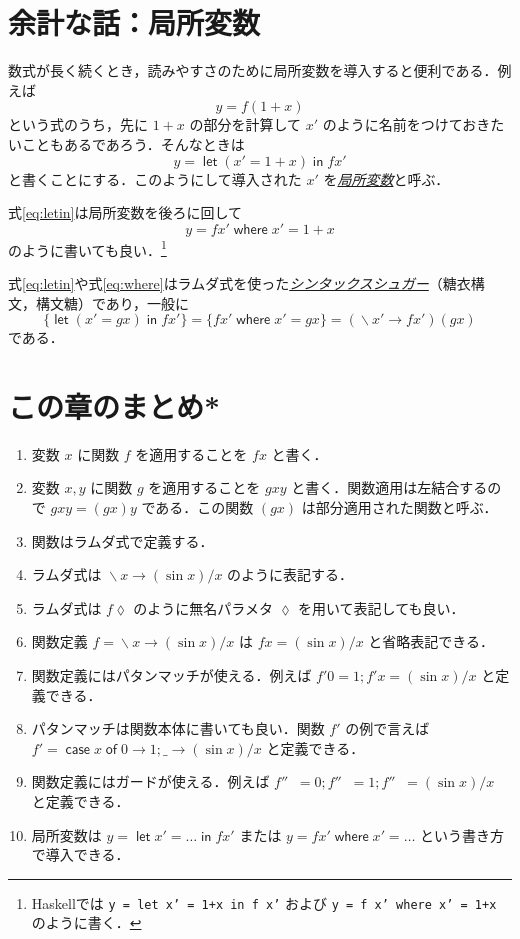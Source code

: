 \documentclass[a4paper]{jsbook}
\newcommand{\programminglanguage}[1]{\textsf{#1}}
\newcommand{\haskell}{\programminglanguage{Haskell}}
\newcommand{\keyword}[1]{{\underline{\emph{#1}}}}
\newcommand{\code}[1]{\texttt{#1}}
\newcommand{\mKeyword}[1]{\mathsf{#1}}
\newcommand{\mOtherwiseKeyword}{\mKeyword{otherwise}}
\newcommand{\mCaseKeyword}{\mKeyword{case}}
\newcommand{\mOfKeyword}{\mKeyword{of}}
\newcommand{\mLetKeyword}{\mKeyword{let}}
\newcommand{\mInKeyword}{\mKeyword{in}}
\newcommand{\mWhereKeyword}{\mKeyword{where}}
\newcommand{\mAnonParameter}{\lozenge}
\newcommand{\mAnyParameter}{\_}
\newcommand{\mGuard}[1]{\mathop{\mid_{#1}}}
\DeclareMathOperator{\mLambda}{\backslash}
\DeclareMathOperator{\mLambdaArrow}{\rightarrow}
\DeclareMathOperator{\mOtherwise}{\mOtherwiseKeyword}
\DeclareMathOperator{\mWhere}{\mWhereKeyword}
\DeclareMathOperator{\mCase}{\mCaseKeyword} %
\DeclareMathOperator{\mOf}{\mOfKeyword} %
\DeclareMathOperator{\mLet}{\mLetKeyword} %
\DeclareMathOperator{\mInKW}{\mInKeyword} %
\newcommand{\mCaseOf}[1]{\mCase{#1}\mOf}
\newcommand{\mLetIn}[2]{\mLet{#1}\mInKW{#2}}
\newcommand{\mLambdaExp}[2]{\mLambda{#1}\mLambdaArrow{#2}}
\begin{document}
\section{余計な話：局所変数}

数式が長く続くとき，読みやすさのために局所変数を導入すると便利である．例えば
\begin{equation}
y=f(1+x)
\end{equation}
という式のうち，先に $1+x$ の部分を計算して $x'$ のように名前をつけておきたいこともあるであろう．そんなときは
\begin{equation}
\label{eq:letin}
y=\mLetIn{(x'=1+x)}{fx'}
\end{equation}
と書くことにする．このようにして導入された $x'$ を\keyword{局所変数}と呼ぶ．

式\eqref{eq:letin}は局所変数を後ろに回して
\begin{equation}
\label{eq:where}
y=fx'\mWhere x'=1+x
\end{equation}
のように書いても良い．\footnote{\haskell では \code{y = let x' = 1+x in f x'} および \code{y = f x' where x' = 1+x} のように書く．}

式\eqref{eq:letin}や式\eqref{eq:where}はラムダ式を使った\keyword{シンタックスシュガー}（糖衣構文，構文糖）であり，一般に
\begin{equation}
\{\mLetIn{(x'=gx)}{fx'}\}
=\{fx'\mWhere x'=gx\}
=(\mLambdaExp{x'}{fx'})(gx)
\end{equation}
である．

\section{この章のまとめ*}

\begin{enumerate}
\item 変数 $x$ に関数 $f$ を適用することを $fx$ と書く．
\item 変数 $x,y$ に関数 $g$ を適用することを $gxy$ と書く．関数適用は左結合するので $gxy=(gx)y$ である．この関数 $(gx)$ は部分適用された関数と呼ぶ．
\item 関数はラムダ式で定義する．
\item ラムダ式は $\mLambdaExp{x}{(\sin x)/x}$ のように表記する．
\item ラムダ式は $f\mAnonParameter$ のように無名パラメタ $\mAnonParameter$ を用いて表記しても良い．
\item 関数定義 $f=\mLambdaExp{x}{(\sin x)/x}$ は $fx=(\sin x)/x$ と省略表記できる．
\item 関数定義にはパタンマッチが使える．例えば $f'0=1;f'x=(\sin x)/x$ と定義できる．
\item パタンマッチは関数本体に書いても良い．関数 $f'$ の例で言えば $f'=\mCaseOf{x}0\rightarrow1;\mAnyParameter\rightarrow(\sin x)/x$ と定義できる．
\item 関数定義にはガードが使える．例えば $f''\mGuard{x<0}=0;f''\mGuard{x\equiv0}=1;f''\mGuard{\mOtherwise}=(\sin x)/x$ と定義できる．
\item 局所変数は $y=\mLetIn{x'=\dots}{fx'}$ または $y=fx'\mWhere x'=\dots$ という書き方で導入できる．
\end{enumerate}
\end{document}
